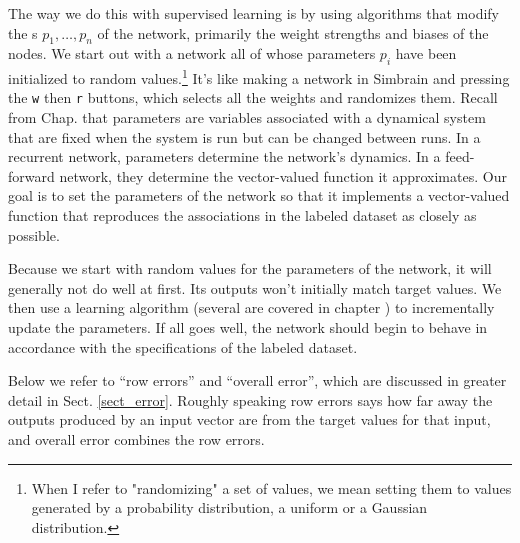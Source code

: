 The way we do this with supervised learning is by using algorithms that modify the s  $p_1,\dots,p_n$ of the network, primarily the weight strengths and biases of the nodes. We start out with a network all of whose parameters $p_i$ have been initialized to random values.\footnote{When I refer to "randomizing" a set of values, we mean setting them to values generated by a probability distribution, \eg a uniform or a Gaussian distribution.}  It's like making a network in Simbrain and pressing the \texttt{w} then \texttt{r} buttons, which selects all the weights and randomizes them. Recall from Chap.  that parameters are variables associated with a dynamical system that are fixed when the system is run but can be changed between runs. In a recurrent network, parameters determine the network's dynamics. In a feed-forward network, they determine the vector-valued function it approximates. Our goal is to set the parameters of the network so that it implements a vector-valued function that reproduces the associations in the labeled dataset as closely as possible.
 
Because we start with random values for the parameters of the network, it will generally not do well at first. Its outputs won't  initially match target values. We then use a learning algorithm (several are covered in chapter ) to incrementally update the parameters. If all goes well, the network should begin to behave in accordance with the specifications of the labeled dataset.

Below we refer to ``row errors''  and ``overall error'', which are discussed in greater detail in Sect. \ref{sect_error}. Roughly speaking row errors says how far away the outputs produced by an input vector are from the target values for that input, and overall error combines the row errors.

